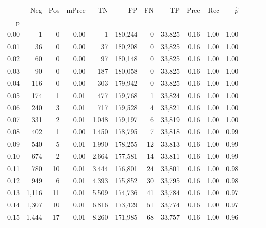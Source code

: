 \begin{tabular}{rrrrrrrrrrrrrr}
\toprule
{} &    Neg &  Pos & mPrec &       TN &       FP &      FN &      TP &  Prec &   Rec & $\hat{p}$ \\
p    &        &      &       &          &          &         &         &       &       &           \\
\midrule
0.00 &      1 &    0 &  0.00 &        1 &  180,244 &       0 &  33,825 &  0.16 &  1.00 &      1.00 \\
0.01 &     36 &    0 &  0.00 &       37 &  180,208 &       0 &  33,825 &  0.16 &  1.00 &      1.00 \\
0.02 &     60 &    0 &  0.00 &       97 &  180,148 &       0 &  33,825 &  0.16 &  1.00 &      1.00 \\
0.03 &     90 &    0 &  0.00 &      187 &  180,058 &       0 &  33,825 &  0.16 &  1.00 &      1.00 \\
0.04 &    116 &    0 &  0.00 &      303 &  179,942 &       0 &  33,825 &  0.16 &  1.00 &      1.00 \\
0.05 &    174 &    1 &  0.01 &      477 &  179,768 &       1 &  33,824 &  0.16 &  1.00 &      1.00 \\
0.06 &    240 &    3 &  0.01 &      717 &  179,528 &       4 &  33,821 &  0.16 &  1.00 &      1.00 \\
0.07 &    331 &    2 &  0.01 &    1,048 &  179,197 &       6 &  33,819 &  0.16 &  1.00 &      1.00 \\
0.08 &    402 &    1 &  0.00 &    1,450 &  178,795 &       7 &  33,818 &  0.16 &  1.00 &      0.99 \\
0.09 &    540 &    5 &  0.01 &    1,990 &  178,255 &      12 &  33,813 &  0.16 &  1.00 &      0.99 \\
0.10 &    674 &    2 &  0.00 &    2,664 &  177,581 &      14 &  33,811 &  0.16 &  1.00 &      0.99 \\
0.11 &    780 &   10 &  0.01 &    3,444 &  176,801 &      24 &  33,801 &  0.16 &  1.00 &      0.98 \\
0.12 &    949 &    6 &  0.01 &    4,393 &  175,852 &      30 &  33,795 &  0.16 &  1.00 &      0.98 \\
0.13 &  1,116 &   11 &  0.01 &    5,509 &  174,736 &      41 &  33,784 &  0.16 &  1.00 &      0.97 \\
0.14 &  1,307 &   10 &  0.01 &    6,816 &  173,429 &      51 &  33,774 &  0.16 &  1.00 &      0.97 \\
0.15 &  1,444 &   17 &  0.01 &    8,260 &  171,985 &      68 &  33,757 &  0.16 &  1.00 &      0.96 \\

\end{tabular}
